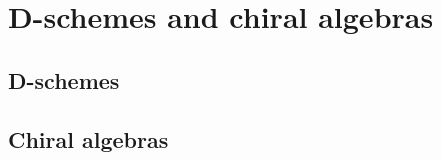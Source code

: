 \chapter{D-schemes and chiral algebras}
    \begin{abstract}
        
    \end{abstract}
    
    \section{D-schemes}
    
    \section{Chiral algebras}